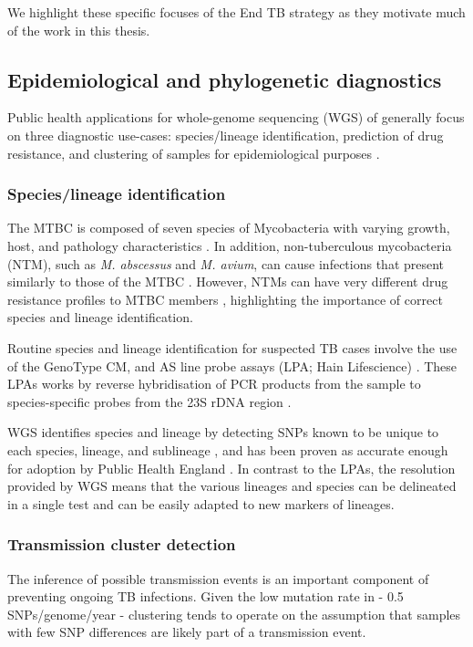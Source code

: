 We highlight these specific focuses of the End TB strategy as they motivate much of the work in this thesis.

\subsection{Epidemiological and phylogenetic diagnostics}
Public health applications for whole-genome sequencing (WGS) of \mtb{} generally focus on three diagnostic use-cases: species/lineage identification, prediction of drug resistance, and clustering of samples for epidemiological purposes \cite{Gordon2021,Meehan2019}.

\subsubsection{Species/lineage identification}
The MTBC is composed of seven species of Mycobacteria with varying growth, host, and pathology characteristics \cite{Homolka2012}. In addition, non-tuberculous mycobacteria (NTM), such as \textit{M. abscessus} and \textit{M. avium}, can cause infections that present similarly to those of the MTBC \cite{Johansen2020}. However, NTMs can have very different drug resistance profiles to MTBC members \cite{Floto2016,Johansen2020}, highlighting the importance of correct species and lineage identification.

Routine species and lineage identification for suspected TB cases involve the use of the GenoType CM, and AS line probe assays (LPA; Hain Lifescience) \cite{Makinen2006,Quan2018}. These LPAs works by reverse hybridisation of PCR products from the sample to species-specific probes from the 23S rDNA region \cite{Makinen2006}. 

WGS identifies species and lineage by detecting SNPs known to be unique to each species, lineage, and sublineage \cite{Coll2014,Homolka2012,Stucki2016standard,Lipworth2019,Freschi2020}, and has been proven as accurate enough for adoption by Public Health England \cite{Quan2018}. In contrast to the LPAs, the resolution provided by WGS means that the various lineages and species can be delineated in a single test and can be easily adapted to new markers of lineages.

\subsubsection{Transmission cluster detection}
The inference of possible transmission events is an important component of preventing ongoing TB infections. Given the low mutation rate in \mtb{} - 0.5 SNPs/genome/year \cite{walker2013} - clustering tends to operate on the assumption that samples with few SNP differences are likely part of a transmission event. 

